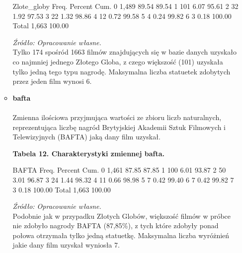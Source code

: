 \begin{itemize}
\begin{itemize}
\begin{stlog}
Zlote_globy {\VBAR}      Freq.     Percent        Cum.
          0 {\VBAR}      1,489       89.54       89.54
          1 {\VBAR}        101        6.07       95.61
          2 {\VBAR}         32        1.92       97.53
          3 {\VBAR}         22        1.32       98.86
          4 {\VBAR}         12        0.72       99.58
          5 {\VBAR}          4        0.24       99.82
          6 {\VBAR}          3        0.18      100.00
      Total {\VBAR}      1,663      100.00
{\smallskip}

\end{stlog}

\textit{\footnotesize{Źródło: Opracowanie własne.}} \\

Tylko 174 spośród 1663 filmów znajdujących się w bazie danych uzyskało co najmniej jednego Złotego Globa, z czego większość (101) uzyskała tylko jedną tego typu nagrodę. Maksymalna liczba statuetek zdobytych przez jeden film wynosi 6.
	
\vspace{0.5cm}
\item[\ding{228}]\textbf{bafta} \\
	\\Zmienna ilościowa przyjmująca wartości ze zbioru liczb naturalnych, reprezentująca liczbę nagród Brytyjskiej Akademii Sztuk Filmowych i Telewizyjnych (BAFTA) jaką dany film uzyskał.
	
	\vspace{0.5cm}
{\centering
\textbf{Tabela 12. Charakterystyki zmiennej bafta.}}
\begin{stlog}	

      BAFTA {\VBAR}      Freq.     Percent        Cum.
          0 {\VBAR}      1,461       87.85       87.85
          1 {\VBAR}        100        6.01       93.87
          2 {\VBAR}         50        3.01       96.87
          3 {\VBAR}         24        1.44       98.32
          4 {\VBAR}         11        0.66       98.98
          5 {\VBAR}          7        0.42       99.40
          6 {\VBAR}          7        0.42       99.82
          7 {\VBAR}          3        0.18      100.00
      Total {\VBAR}      1,663      100.00
{\smallskip}

\end{stlog}

\textit{\footnotesize{Źródło: Opracowanie własne.}} \\	

Podobnie jak w przypadku Złotych Globów, większość filmów w próbce nie zdobyło nagrody BAFTA (87,85\%), z tych które zdobyły ponad połowa otrzymała tylko jedną statuetkę. Maksymalna liczba wyróżnień jakie dany film uzyskał wyniosła 7.
	
	\end{itemize}

\end{itemize}

